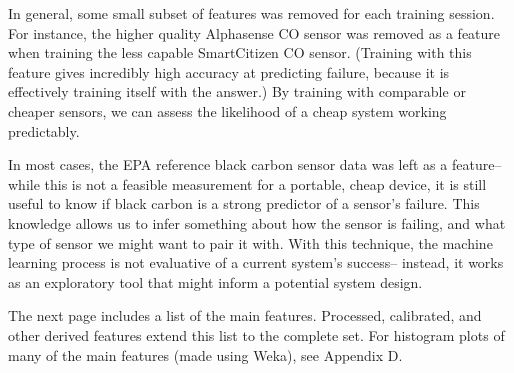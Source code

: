 In general, some small subset of features was removed for each training session.  For instance, the higher quality Alphasense CO sensor was removed as a feature when training the less capable SmartCitizen CO sensor.  (Training with this feature gives incredibly high accuracy at predicting failure, because it is effectively training itself with the answer.)  By training with comparable or cheaper sensors, we can assess the likelihood of a cheap system working predictably.

In most cases, the EPA reference black carbon sensor data was left as a feature-- while this is not a feasible measurement for a portable, cheap device, it is still useful to know if black carbon is a strong predictor of a sensor's failure.  This knowledge allows us to infer something about how the sensor is failing, and what type of sensor we might want to pair it with.  With this technique, the machine learning process is not evaluative of a current system's success-- instead, it works as an exploratory tool that might inform a potential system design.

The next page includes a list of the main features.  Processed, calibrated, and other derived features extend this list to the complete set.  For histogram plots of many of the main features (made using Weka), see Appendix D.


